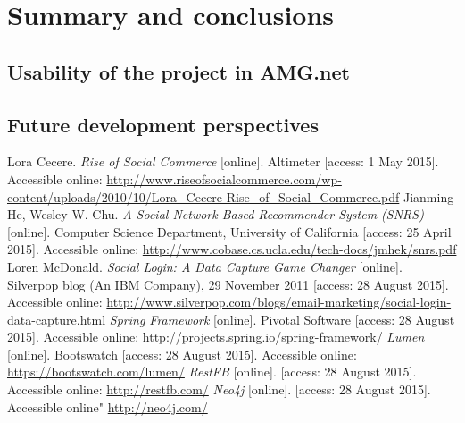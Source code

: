 \documentclass[12pt]{report}
\begin{document}
\chapter{Summary and conclusions}
\section{Usability of the project in AMG.net}
\section{Future development perspectives}



\begin{thebibliography}{99}
Lora Cecere. \textit{Rise of Social Commerce} [online]. Altimeter [access: 1 May 2015]. Accessible online: \url{http://www.riseofsocialcommerce.com/wp-content/uploads/2010/10/Lora_Cecere-Rise_of_Social_Commerce.pdf}
Jianming He, Wesley W. Chu. \textit{A Social Network-Based Recommender System (SNRS)} [online]. Computer Science Department, University of California [access: 25 April 2015]. Accessible online: \url{http://www.cobase.cs.ucla.edu/tech-docs/jmhek/snrs.pdf}
Loren McDonald. \textit{Social Login: A Data Capture Game Changer} [online]. Silverpop blog (An IBM Company), 29 November 2011 [access: 28 August 2015]. Accessible online: \url{http://www.silverpop.com/blogs/email-marketing/social-login-data-capture.html}
\textit{Spring Framework} [online]. Pivotal Software [access: 28 August 2015]. Accessible online: \url{http://projects.spring.io/spring-framework/}
\textit{Lumen} [online]. Bootswatch [access: 28 August 2015]. Accessible online: \url{https://bootswatch.com/lumen/}
\textit{RestFB} [online]. [access: 28 August 2015]. Accessible online: \url{http://restfb.com/}
\textit{Neo4j} [online]. [access: 28 August 2015]. Accessible online" \url{http://neo4j.com/}

\end{thebibliography}
\end{document}

